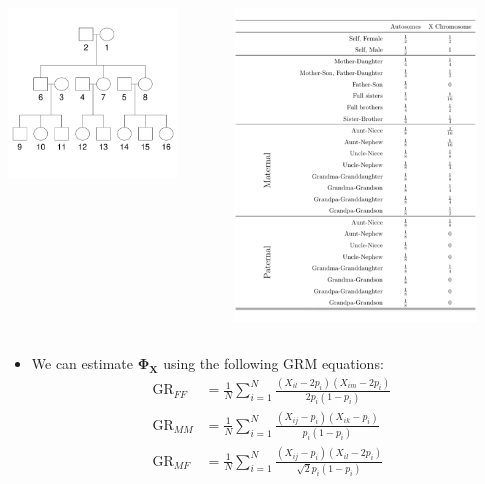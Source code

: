 \documentclass{beamer}
\begin{document}
\begin{frame}
\begin{columns}
    \begin{column}{0.3\textwidth}
      \centering
      \includegraphics[height=4.5cm]{../pedigree_16individs.pdf}
    \end{column}
    \begin{column}{0.5\textwidth}
      \centering
      \includegraphics[height=8.3cm]{xchr_kc_values.pdf}
    \end{column}
 \end{columns}
\end{frame}

\begin{frame}
\begin{itemize}
\item We can estimate $\mathbf{\Phi_X}$ using the following GRM equations:
\begin{align*}
\mbox{GR}_{FF}&=\frac{1}{N}\sum_{i=1}^N \frac{(X_{il}-2p_i)(X_{im}-2p_i)}{2p_i(1-p_i)}\\
\mbox{GR}_{MM}&=\frac{1}{N}\sum_{i=1}^N \frac{(X_{ij}-p_i)(X_{ik}-p_i)}{p_i(1-p_i)}\\
\mbox{GR}_{MF}&=\frac{1}{N}\sum_{i=1}^N \frac{(X_{ij}-p_i)(X_{il}-2p_i)}{\sqrt{2}p_i(1-p_i)}
\end{align*}
\end{itemize}
\end{frame}
\end{document}
